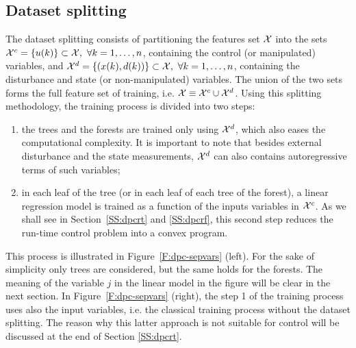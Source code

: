 \subsection{Dataset splitting}
\label{SS:sepvar}

\textcolor[rgb]{0,0,1}{The dataset splitting consists of partitioning the features set $\mathcal{X}$ into the sets $\mathcal{X}^c = \{u(k)\}\subset\mathcal{X},\ \forall k=1,\ldots,n$, containing the control (or manipulated) variables, and $\mathcal{X}^d = \{(x(k),d(k))\}\subset\mathcal{X},\ \forall k=1,\ldots,n$, containing the disturbance and state (or non-manipulated) variables.
The union of the two sets forms the full feature set of training, i.e. $\mathcal{X} \equiv \mathcal{X}^c \cup \mathcal{X}^d$.
Using this splitting methodology, the training process is divided into two steps:
	\begin{enumerate}
		\item the trees and the forests are trained only using $\mathcal{X}^d$, which also eases the computational complexity.
			  It is important to note that besides external disturbance and the state measurements, $\mathcal{X}^d$ can also contains autoregressive terms of such variables;
		\item in each leaf of the tree (or in each leaf of each tree of the forest), a linear regression model is trained as a function of the inputs variables in $\mathcal{X}^c$.
		As we shall see in Section~\ref{SS:dpcrt} and \ref{SS:dpcrf}, this second step reduces the run-time control problem into a convex program.
	\end{enumerate}
This process is illustrated in Figure~\ref{F:dpc-sepvars} (left). For the sake of simplicity only trees are considered, but the same holds for the forests. The meaning of the variable $j$ in the linear model in the figure will be clear in the next section.
In Figure~\ref{F:dpc-sepvars} (right), the step 1 of the training process uses also the input variables, i.e. the classical training process without the dataset splitting.
The reason why this latter approach is not suitable for control will be discussed at the end of Section \ref{SS:dpcrt}.
}

